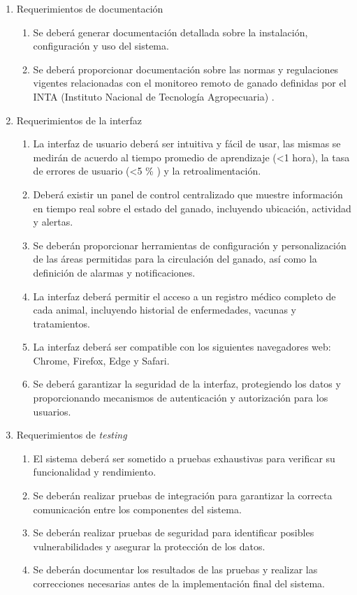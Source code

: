 \documentclass[
11pt, %
]{charter}
\begin{document}
\begin{enumerate}
	\item Requerimientos de documentación
		\begin{enumerate}
			\item Se deberá generar documentación detallada sobre la instalación, configuración y uso del sistema.
			\item Se deberá proporcionar documentación sobre las normas y regulaciones vigentes relacionadas con el monitoreo remoto de ganado definidas por el INTA (Instituto Nacional de Tecnología Agropecuaria) .
		\end{enumerate}
	
	\item Requerimientos de la interfaz
		\begin{enumerate}			
			\item La interfaz de usuario deberá ser intuitiva y fácil de usar, las mismas se medirán de acuerdo al tiempo promedio de aprendizaje (\textless 1 hora), la tasa de errores de usuario (\textless  5 \% ) y la retroalimentación.
			\item Deberá existir un panel de control centralizado que muestre información en tiempo real sobre el estado del ganado, incluyendo ubicación, actividad y alertas.
			\item  Se deberán proporcionar herramientas de configuración y personalización de las áreas permitidas para la circulación del ganado, así como la definición de alarmas y notificaciones.
			\item La interfaz deberá permitir el acceso a un registro médico completo de cada animal, incluyendo historial de enfermedades, vacunas y tratamientos.
			\item La interfaz deberá ser compatible con los siguientes navegadores web: Chrome, Firefox, Edge y Safari.
			\item Se deberá garantizar la seguridad de la interfaz, protegiendo los datos y proporcionando mecanismos de autenticación y autorización para los usuarios.
		\end{enumerate}
		
	\item Requerimientos de \emph{testing}
		\begin{enumerate}
			\item El sistema deberá ser sometido a pruebas exhaustivas para verificar su funcionalidad y rendimiento.
			\item Se deberán realizar pruebas de integración para garantizar la correcta comunicación entre los componentes del sistema.
			\item Se deberán realizar pruebas de seguridad para identificar posibles vulnerabilidades y asegurar la protección de los datos.
			\item Se deberán documentar los resultados de las pruebas y realizar las correcciones necesarias antes de la implementación final del sistema.
		\end{enumerate}
		
\end{enumerate}
\end{document}
